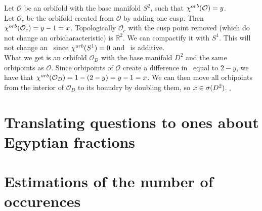 Let $\mathcal{O}$ be an orbifold with the base manifold $S^2$, such that ${\chi^{orb}(\mathcal{O})} 
= y$. \\
Let $\mathcal{O}_c$ be the orbifold created from $\mathcal{O}$ by adding one cusp. 
Then ${\chi^{orb}(\mathcal{O}_c)} = y - 1 = x$. Topologically $\mathcal{O}_c$ with the cusp point 
removed (which do not change an orbicharacteristic) is $\mathbb{R}^2$. 
We can compactify it with $S^1$. This will not change an \Eoc\ since ${\chi^{orb}(S^1)} = 0$ and 
\Eoc\ is additive.
\\ What we get is an orbifold $\mathcal{O}_D$ with the base 
manifold $D^2$ and the same 
orbipoints as $\mathcal{O}$. Since orbipoints of $\mathcal{O}$ create a difference 
in \Eoc\ equal to $2-y$, we have that ${\chi^{orb}(\mathcal{O}_D)} = 1 - (2-y) = y - 1 = x$. 
We can then move all orbipoints from the interior of $\mathcal{O}_D$ to its boundry 
by doubling them, so $x \in {{\sigma}(D^2)}$. $_\square$

\section{Translating questions to ones about Egyptian fractions}\label{Egyptian_fractions}

\section{Estimations of the number of occurences}




















